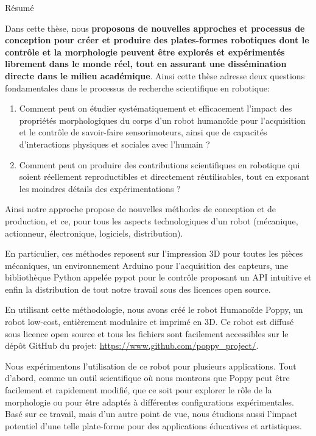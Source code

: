 {Résumé}


Dans cette thèse, nous \textbf{proposons de nouvelles approches et processus de conception pour créer et produire des plates-formes robotiques dont le contrôle et la morphologie peuvent être explorés et expérimentés librement dans le monde réel, tout en assurant une dissémination directe dans le milieu académique}.
Ainsi cette thèse adresse deux questions fondamentales dans le processus de recherche scientifique en robotique:

\begin{enumerate}
  \item Comment peut on étudier systématiquement et efficacement l’impact des propriétés morphologiques du corps d’un robot humanoïde pour l’acquisition et le contrôle de savoir-faire sensorimoteurs, ainsi que de capacités d’interactions physiques et sociales avec l’humain ?
  \item Comment peut on produire des contributions scientifiques en robotique qui soient réellement reproductibles et directement réutilisables, tout en exposant les moindres détails des expérimentations ?
\end{enumerate}

Ainsi notre approche propose de nouvelles méthodes de conception et de production, et ce, pour tous les aspects technologiques d'un robot (mécanique, actionneur, électronique, logiciels, distribution).

En particulier, ces méthodes reposent sur l'impression 3D pour toutes les pièces mécaniques, un environnement Arduino pour l'acquisition des capteurs, une bibliothèque Python appelée pypot pour le contrôle proposant un API intuitive et enfin la distribution de tout notre travail sous des licences open source. 

En utilisant cette méthodologie, nous avons créé le robot Humanoïde Poppy, un robot low-cost, entièrement modulaire et imprimé en 3D. Ce robot est diffusé sous licence open source et tous les fichiers sont facilement accessibles sur le dépôt GitHub du projet: \url{https://www.github.com/poppy_project/}.

Nous expérimentons l'utilisation de ce robot pour plusieurs applications. Tout d'abord, comme un outil scientifique où nous montrons que Poppy peut être facilement et rapidement modifié, que ce soit pour explorer le rôle de la morphologie ou pour être adaptés à différentes configurations expérimentales. Basé sur ce travail, mais d'un autre point de vue, nous étudions aussi l'impact potentiel d'une telle plate-forme pour des applications éducatives et artistiques.

